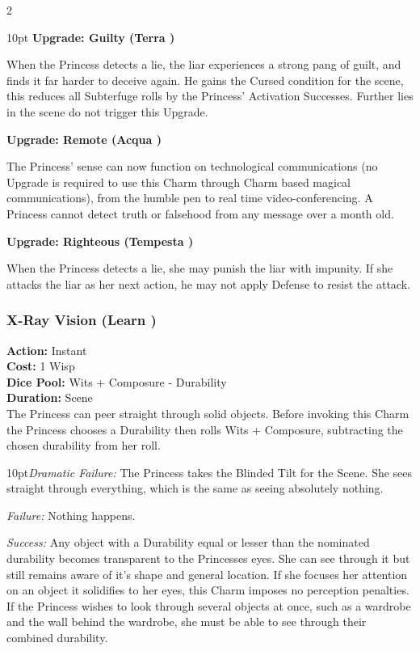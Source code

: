 \begin{multicols}{2}
\begin{myindentpar}{10pt}
\textbf{Upgrade: Guilty (Terra \textbullet)}

When the Princess detects a lie, the liar experiences a strong pang of guilt, and finds it far harder to deceive again. He gains the Cursed condition for the scene, this reduces all Subterfuge rolls by the Princess' Activation Successes. Further lies in the scene do not trigger this Upgrade.

\textbf{Upgrade: Remote (Acqua \textbullet)}

The Princess' sense can now function on technological communications (no Upgrade is required to use this Charm through Charm based magical communications), from the humble pen to real time video-conferencing. A Princess cannot detect truth or falsehood from any message over a month old. 

\textbf{Upgrade: Righteous (Tempesta \textbullet)}

When the Princess detects a lie, she may punish the liar with impunity. If she attacks the liar as her next action, he may not apply Defense to resist the attack.\end{myindentpar}

\subsubsection*{X-Ray Vision (Learn \textbullet)}

\noindent \textbf{Action:} Instant \\

\noindent \textbf{Cost:} 1 Wisp \\

\noindent \textbf{Dice Pool:} Wits + Composure - Durability \\

\noindent \textbf{Duration:} Scene \\

\noindent The Princess can peer straight through solid objects. Before invoking this Charm the Princess chooses a Durability then rolls Wits + Composure, subtracting the chosen durability from her roll. 


    \begin{myindentpar}{10pt}\emph{Dramatic Failure:} The Princess takes the Blinded Tilt for the Scene. She sees straight through everything, which is the same as seeing absolutely nothing. 

    \emph{Failure:} Nothing happens.

    \emph{Success:} Any object with a Durability equal or lesser than the nominated durability becomes transparent to the Princesses eyes. She can see through it but still remains aware of it's shape and general location. If she focuses her attention on an object it solidifies to her eyes, this Charm imposes no perception penalties. If the Princess wishes to look through several objects at once, such as a wardrobe and the wall behind the wardrobe, she must be able to see through their combined durability. 
	

\end{myindentpar}
\end{multicols}
